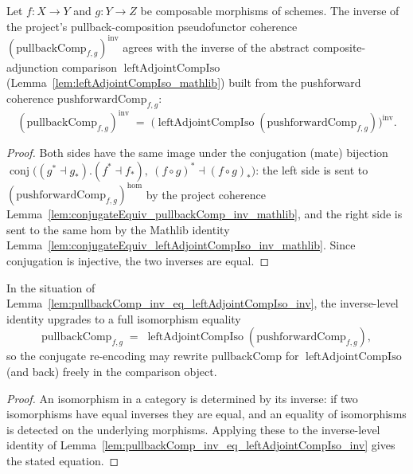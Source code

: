 \begin{lemma}
  \label{lem:pullbackComp_inv_eq_leftAdjointCompIso_inv}
  Let \(f : X \to Y\) and \(g : Y \to Z\) be composable morphisms of schemes. The inverse of the
  project's pullback-composition pseudofunctor coherence
  \((\mathrm{pullbackComp}_{f,g})^{\mathrm{inv}}\) agrees with the inverse of the abstract
  composite-adjunction comparison \(\operatorname{leftAdjointCompIso}\)
  (Lemma~\ref{lem:leftAdjointCompIso_mathlib}) built from the pushforward coherence
  \(\mathrm{pushforwardComp}_{f,g}\):
  \[
    (\mathrm{pullbackComp}_{f,g})^{\mathrm{inv}}
      \;=\; \bigl(\operatorname{leftAdjointCompIso}(\mathrm{pushforwardComp}_{f,g})\bigr)^{\mathrm{inv}}.
  \]
  \begin{proof}
    Both sides have the same image under the conjugation (mate) bijection
    \(\operatorname{conj}\bigl((g^{*}\dashv g_{*}).(f^{*}\dashv f_{*}),\ (f\circ g)^{*}\dashv (f\circ g)_{*}\bigr)\):
    the left side is sent to \((\mathrm{pushforwardComp}_{f,g})^{\mathrm{hom}}\) by the project coherence
    Lemma~\ref{lem:conjugateEquiv_pullbackComp_inv_mathlib}, and the right side is sent to the same hom by
    the Mathlib identity Lemma~\ref{lem:conjugateEquiv_leftAdjointCompIso_inv_mathlib}. Since conjugation
    is injective, the two inverses are equal.
  \end{proof}
\end{lemma}

\begin{lemma}
  \label{lem:pullbackComp_eq_leftAdjointCompIso}
  In the situation of Lemma~\ref{lem:pullbackComp_inv_eq_leftAdjointCompIso_inv}, the inverse-level
  identity upgrades to a full isomorphism equality
  \[
    \mathrm{pullbackComp}_{f,g}
      \;=\; \operatorname{leftAdjointCompIso}(\mathrm{pushforwardComp}_{f,g}),
  \]
  so the conjugate re-encoding may rewrite \(\mathrm{pullbackComp}\) for
  \(\operatorname{leftAdjointCompIso}\) (and back) freely in the comparison object.
  \begin{proof}
    An isomorphism in a category is determined by its inverse: if two isomorphisms have equal inverses
    they are equal, and an equality of isomorphisms is detected on the underlying morphisms. Applying
    these to the inverse-level identity of
    Lemma~\ref{lem:pullbackComp_inv_eq_leftAdjointCompIso_inv} gives the stated equation.
  \end{proof}
\end{lemma}

